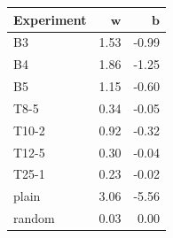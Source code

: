 \begin{tabular}{lrr}
\toprule
\textbf{Experiment} & $\mathbf{w}$ & $\mathbf{b}$ \\
\midrule
B3 & 1.53 & -0.99 \\
B4 & 1.86 & -1.25 \\
B5 & 1.15 & -0.60 \\
T8-5 & 0.34 & -0.05 \\
T10-2 & 0.92 & -0.32 \\
T12-5 & 0.30 & -0.04 \\
T25-1 & 0.23 & -0.02 \\
\midrule
plain & 3.06 & -5.56 \\
random & 0.03 & 0.00 \\
\bottomrule
\end{tabular}

